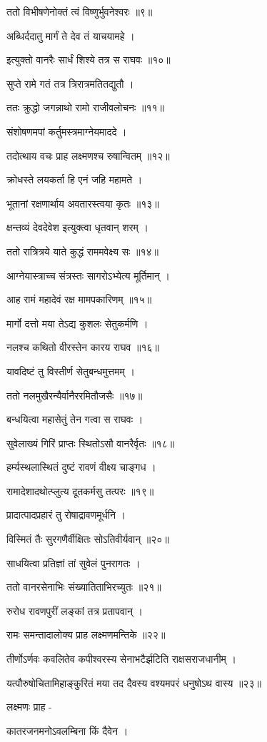 ततो विभीषणेनोक्तं त्वं विष्णुर्भुवनेश्वरः ॥९॥

अब्धिर्ददातु मार्गं ते देव तं याचयामहे ।

इत्युक्तो वानरैः सार्धं शिश्ये तत्र स राघवः ॥१०॥

सुप्ते रामे गतं तत्र त्रिरात्रमतितद्युतौ ।

ततः क्रुद्धो जगन्नाथो रामो राजीवलोचनः ॥११॥

संशोषणमपां कर्तुमस्त्रमाग्नेयमाददे ।

तदोत्थाय वचः प्राह लक्ष्मणश्च रुषान्वितम् ॥१२॥

क्रोधस्ते लयकर्ता हि एनं जहि महामते ।

भूतानां रक्षणार्थाय अवतारस्त्वया कृतः ॥१३॥

क्षन्तव्यं देवदेवेश इत्युक्त्वा धृतवान् शरम् ।

ततो रात्रित्रये याते कुद्धं राममवेक्ष्य सः ॥१४॥

आग्नेयास्त्राच्च संत्रस्तः सागरोऽभ्येत्य मूर्तिमान् ।

आह रामं महादेवं रक्ष मामपकारिणम् ॥१५॥

मार्गो दत्तो मया तेऽद्य कुशलः सेतुकर्मणि ।

नलश्च कथितो वीरस्तेन कारय राघव ॥१६॥

यावदिष्टं तु विस्तीर्ण सेतुबन्धमुत्तमम् ।

ततो नलमुखैरन्यैर्वानैररमितौजसैः ॥१७॥

बन्धयित्वा महासेतुं तेन गत्वा स राघवः ।

सुवेलाख्यं गिरिं प्राप्तः स्थितोऽसौ वानरैर्वृतः ॥१८॥

हर्म्यस्थलास्थितं दुष्टं रावणं वीक्ष्य चाङ्गध ।

रामादेशादथोत्प्लुत्य दूतकर्मसु तत्परः ॥१९॥

प्रादात्पादप्रहारं तु रोषाद्रावणमूर्धनि ।

विस्मितं तैः सुरगणैर्वीक्षितः सोऽतिवीर्यवान् ॥२०॥

साधयित्वा प्रतिज्ञां तां सुवेलं पुनरागतः ।

ततो वानरसेनाभिः संख्यातिताभिरच्युतः ॥२१॥

रुरोध रावणपुरीं लङ्कां तत्र प्रतापवान् ।

रामः समन्तादालोक्य प्राह लक्ष्मणमन्तिके ॥२२॥

तीर्णोऽर्णवः कवलितेव कपीश्वरस्य सेनाभटैर्झटिति राक्षसराजधानीम् ।

यत्पौरुषोचितामिहाङ्कुरितं मया तद दैवस्य वश्यमपरं धनुषोऽथ वास्य ॥२३॥

लक्ष्मणः प्राह -

कातरजनमनोऽवलम्बिना किं दैवेन ।

